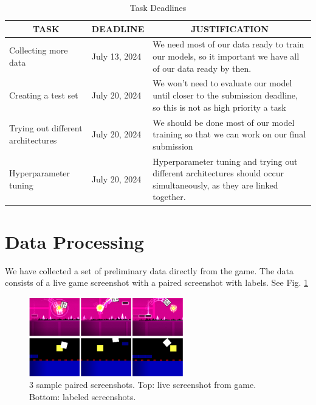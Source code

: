 \documentclass{article} %
\begin{document}
\begin{table}[h]
\caption{Task Deadlines}
\label{table:task deadlines}
\begin{center}
\begin{tabular}{|p{3cm}|p{3cm}|p{6cm}|}
\hline
\multicolumn{1}{|c|}{\bf TASK} & \multicolumn{1}{c|}{\bf DEADLINE} & \multicolumn{1}{c|}{\bf JUSTIFICATION}\\ \hline
Collecting more data & July 13, 2024 & We need most of our data ready to train our models, so it important we have all of our data ready by then. \\ \hline 
Creating a test set & July 20, 2024 & We won't need to evaluate our model until closer to the submission deadline, so this is not as high priority a task \\ \hline 
Trying out different architectures & July 20, 2024 & We should be done most of our model training so that we can work on our final submission \\ \hline
Hyperparameter tuning & July 20, 2024 & Hyperparameter tuning and trying out different architectures should occur simultaneously, as they are linked together. \\ \hline
\end{tabular}
\end{center}
\end{table}

\section{Data Processing}

We have collected a set of preliminary data directly from the game. The data consists of a live game screenshot with a paired screenshot with labels. See Fig. \ref{fig:sample_data.png}

\begin{figure}[!h]
\begin{center}
\includegraphics[width=0.6\textwidth]{Figs/sample_data.png}
\end{center}
\caption{3 sample paired screenshots. Top: live screenshot from game. Bottom: labeled screenshots.}
\label{fig:sample_data.png}
\end{figure}
\end{document}
